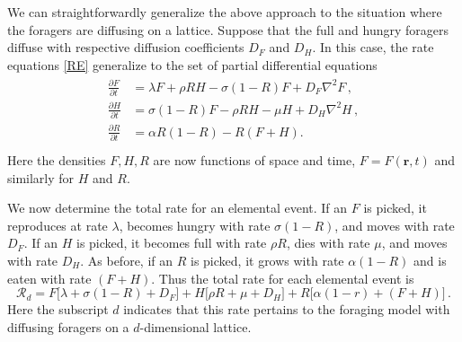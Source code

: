 \documentclass[11pt]{iopart}
\begin{document}
We can straightforwardly generalize the above approach to the situation where
the foragers are diffusing on a lattice.  Suppose that the full and hungry
foragers diffuse with respective diffusion coefficients $D_F$ and $D_H$.  In
this case, the rate equations \eqref{RE} generalize to the set of partial
differential equations
\begin{align}
  \label{pde}
\begin{split}
\frac{\partial F}{\partial t} &= \lambda F + \rho  RH - \sigma (1-R)F+D_F\nabla^2F\,,\\[0.125in]
\frac{\partial H}{\partial t}  &= \sigma (1-R)F - \rho RH - \mu H+D_H\nabla^2H\,, \\[0.125in]
\frac{\partial R}{\partial t}  &= \alpha R(1-R) -  R(F+H).\\
\end{split}
\end{align}
Here the densities $F,H,R$ are now functions of space and time,
$F=F(\mathbf{r},t)$ and similarly for $H$ and $R$.

We now determine the total rate for an elemental event.  If an $F$ is picked,
it reproduces at rate $\lambda$, becomes hungry with rate $\sigma(1-R)$, and
moves with rate $D_F$.  If an $H$ is picked, it becomes full with rate
$\rho R$, dies with rate $\mu$, and moves with rate $D_H$.  As before, if an
$R$ is picked, it grows with rate $\alpha(1-R)$ and is eaten with rate
$(F+H)$.  Thus the total rate for each elemental event is
\begin{equation}
\mathcal{R}_d=F\big[\lambda +\sigma(1-R)+D_F\big]+ H\big[\rho R+\mu+D_H\big]+
R\big[\alpha(1-r)+(F+H)\big]\,.
\end{equation}
Here the subscript $d$ indicates that this rate pertains to the foraging
model with diffusing foragers on a $d$-dimensional lattice.
\end{document}
